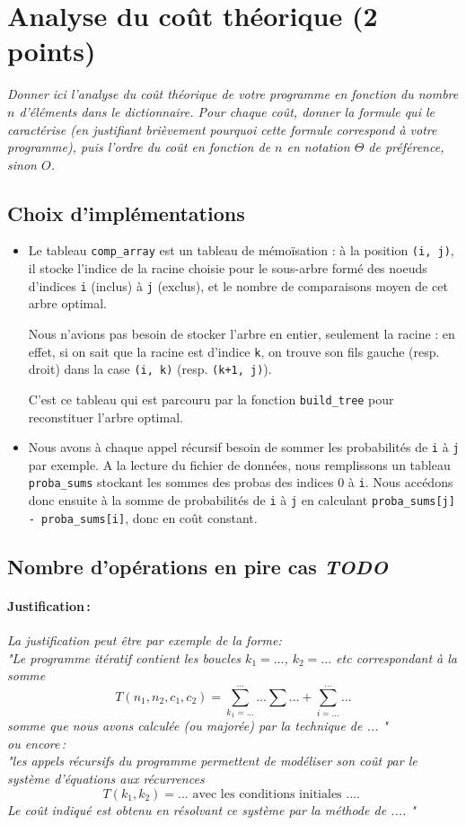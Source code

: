\documentclass[a4paper, 10pt, french]{article}
\begin{document}
\section{Analyse du coût théorique (2 points)}
{\em Donner ici l'analyse du coût théorique de votre programme en fonction du nombre $n$ d'éléments dans le dictionnaire.
 Pour chaque coût, donner la formule qui le caractérise (en justifiant brièvement pourquoi cette formule correspond à votre programme), 
 puis l'ordre du coût en fonction de $n$ en notation $\Theta$ de préférence, sinon $O$.}

 \subsection{Choix d'implémentations}
 \begin{itemize}
	 \item Le tableau \verb?comp_array? est un tableau de mémoïsation : à la position \verb?(i, j)?, il stocke l'indice de la racine choisie pour le sous-arbre formé des noeuds d'indices \verb?i? (inclus) à \verb?j? (exclus), et le nombre de comparaisons moyen de cet arbre optimal.

		 Nous n'avions pas besoin de stocker l'arbre en entier, seulement la racine : en effet, si on sait que la racine est d'indice \verb?k?, on trouve son fils gauche (resp. droit) dans la case \verb?(i, k)? (resp. \verb?(k+1, j)?).

		 C'est ce tableau qui est parcouru par la fonction \verb?build_tree? pour reconstituer l'arbre optimal.

	 \item Nous avons à chaque appel récursif besoin de sommer les probabilités de \verb?i? à \verb?j? par exemple. A la lecture du fichier de données, nous remplissons un tableau \verb?proba_sums? stockant les sommes des probas des indices 0 à \verb?i?.
		 Nous accédons donc ensuite à la somme de probabilités de \verb?i? à \verb?j? en calculant \verb?proba_sums[j] - proba_sums[i]?, donc en coût constant.
 \end{itemize}

  \subsection{Nombre  d'opérations en pire cas \em TODO}
	\paragraph{Justification\,: }
	{\em La justification peut être par exemple de la forme: \\ 
	   "Le programme itératif contient les boucles $k_1=...$, $k_2= ...$ etc correspondant à la somme 
	  $$T(n_1, n_2, c_1, c_2) = \sum_{k_1=...}^{...} ... \sum ... + \sum_{i=...}^{...} ...$$ 
	  somme que nous avons calculée (ou majorée) par la technique de  ... " \\
	  ou  encore\,:  \\
	  "les appels récursifs du programme permettent de modéliser son coût par le système d'équations aux récurrences 
	  $$T(k_1, k_2) = ...  \mbox{~avec~les~conditions~initiales~....~} $$
	  Le coût indiqué est obtenu en résolvant ce système par la méthode de  .... "
	} 
\end{document}
